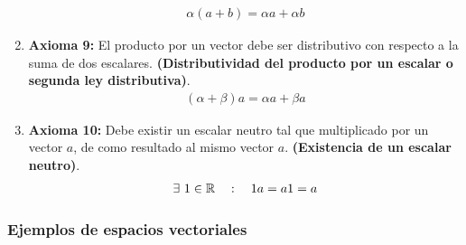 \begin{enumerate}
\begin{align}
        \alpha (a + b) = \alpha a + \alpha b
    \end{align}
    \item \textbf{Axioma 9:} El producto por un vector debe ser distributivo con respecto a la suma de dos escalares. \textbf{(Distributividad del producto por un escalar o segunda ley distributiva)}. \begin{align}
        (\alpha + \beta) a = \alpha a + \beta a
    \end{align}
    \item \textbf{Axioma 10:} Debe existir un escalar neutro tal que multiplicado por un vector $a$, de como resultado al mismo vector $a$. \textbf{(Existencia de un escalar neutro)}. \begin{align}
        \exists \ 1 \in \mathbb{R} \quad : \quad 1 a = a 1 = a
    \end{align}
\end{enumerate}

\begin{note}
[
    \textbf{En resumen. Sean} $a, b, c \in \V$ y $\alpha, \beta \in \R$ \textbf{entonces:} \\
    \begin{enumerate}
        \item \textbf{Cerradura bajo la suma:} $a + b \in \V$
        \item \textbf{Conmutatividad:} $a + b = b + a$
        \item \textbf{Asociatividad bajo la suma:} $(a + b) + c = a + (b + c)$
        \item \textbf{Vector nulo:} $a + \vec{0} = a$
        \item \textbf{Inverso aditivo:} $a + (-a) = \vec{0}$
        \item \textbf{Cerradura bajo el producto por un escalar:} $\alpha a \in \V$
        \item \textbf{Primera ley distributiva:} $\alpha (a + b) = \alpha a + \alpha b$
        \item \textbf{Segunda ley distributiva:} $(\alpha + \beta) a = \alpha a + \beta a$
        \item \textbf{Ley asociativa del producto por un escalar:} $\alpha (\beta a) = (\alpha \beta) a$
        \item \textbf{Neutro multiplicativo:} $1 a = a$
    \end{enumerate}
]
\end{note}

\subsubsection{Ejemplos de espacios vectoriales}
\label{sec:ejemplos_de_espacios_vectoriales}

